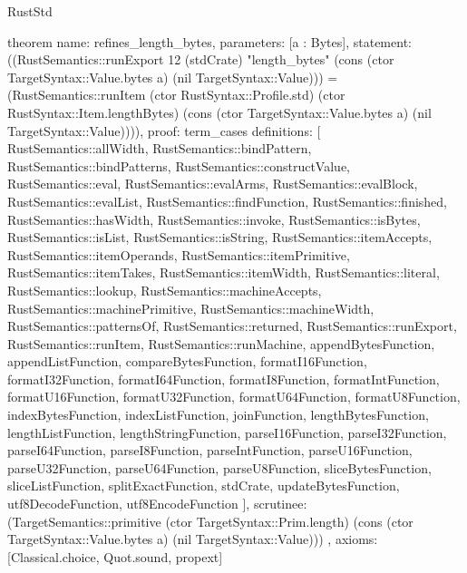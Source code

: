 \begin{lexlean}{RustStd}
\begin{semanticmodule}
theorem{
  name: refines_length_bytes,
  parameters: [a : Bytes],
  statement: ((RustSemantics::runExport 12 (stdCrate) "length_bytes" (cons (ctor TargetSyntax::Value.bytes a) (nil TargetSyntax::Value))) = (RustSemantics::runItem (ctor RustSyntax::Profile.std) (ctor RustSyntax::Item.lengthBytes) (cons (ctor TargetSyntax::Value.bytes a) (nil TargetSyntax::Value)))),
  proof: term_cases{
    definitions: [
      RustSemantics::allWidth,
      RustSemantics::bindPattern,
      RustSemantics::bindPatterns,
      RustSemantics::constructValue,
      RustSemantics::eval,
      RustSemantics::evalArms,
      RustSemantics::evalBlock,
      RustSemantics::evalList,
      RustSemantics::findFunction,
      RustSemantics::finished,
      RustSemantics::hasWidth,
      RustSemantics::invoke,
      RustSemantics::isBytes,
      RustSemantics::isList,
      RustSemantics::isString,
      RustSemantics::itemAccepts,
      RustSemantics::itemOperands,
      RustSemantics::itemPrimitive,
      RustSemantics::itemTakes,
      RustSemantics::itemWidth,
      RustSemantics::literal,
      RustSemantics::lookup,
      RustSemantics::machineAccepts,
      RustSemantics::machinePrimitive,
      RustSemantics::machineWidth,
      RustSemantics::patternsOf,
      RustSemantics::returned,
      RustSemantics::runExport,
      RustSemantics::runItem,
      RustSemantics::runMachine,
      appendBytesFunction,
      appendListFunction,
      compareBytesFunction,
      formatI16Function,
      formatI32Function,
      formatI64Function,
      formatI8Function,
      formatIntFunction,
      formatU16Function,
      formatU32Function,
      formatU64Function,
      formatU8Function,
      indexBytesFunction,
      indexListFunction,
      joinFunction,
      lengthBytesFunction,
      lengthListFunction,
      lengthStringFunction,
      parseI16Function,
      parseI32Function,
      parseI64Function,
      parseI8Function,
      parseIntFunction,
      parseU16Function,
      parseU32Function,
      parseU64Function,
      parseU8Function,
      sliceBytesFunction,
      sliceListFunction,
      splitExactFunction,
      stdCrate,
      updateBytesFunction,
      utf8DecodeFunction,
      utf8EncodeFunction
    ],
    scrutinee: (TargetSemantics::primitive (ctor TargetSyntax::Prim.length) (cons (ctor TargetSyntax::Value.bytes a) (nil TargetSyntax::Value)))
  },
  axioms: [Classical.choice, Quot.sound, propext]
}


\end{semanticmodule}
\end{lexlean}
